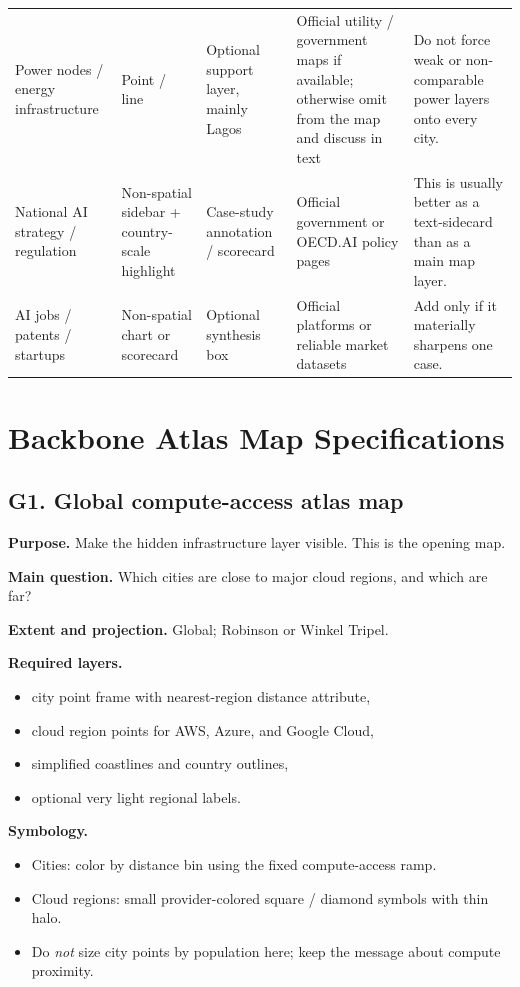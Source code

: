 \documentclass[11pt]{article}
\begin{document}
\begin{longtable}{P{0.18\textwidth} P{0.12\textwidth} P{0.2\textwidth} P{0.23\textwidth} P{0.2\textwidth}}
Power nodes / energy infrastructure & Point / line & Optional support layer, mainly Lagos & Official utility / government maps if available; otherwise omit from the map and discuss in text & Do not force weak or non-comparable power layers onto every city. \\
National AI strategy / regulation & Non-spatial sidebar + country-scale highlight & Case-study annotation / scorecard & Official government or OECD.AI policy pages & This is usually better as a text-sidecard than as a main map layer. \\
AI jobs / patents / startups & Non-spatial chart or scorecard & Optional synthesis box & Official platforms or reliable market datasets & Add only if it materially sharpens one case. \\
\bottomrule
\end{longtable}

\section{Backbone Atlas Map Specifications}

\subsection{G1. Global compute-access atlas map}
\textbf{Purpose.} Make the hidden infrastructure layer visible. This is the opening map.

\textbf{Main question.} Which cities are close to major cloud regions, and which are far?

\textbf{Extent and projection.} Global; Robinson or Winkel Tripel.

\textbf{Required layers.}
\begin{itemize}[leftmargin=1.4em,itemsep=0.2em]
    \item city point frame with nearest-region distance attribute,
    \item cloud region points for AWS, Azure, and Google Cloud,
    \item simplified coastlines and country outlines,
    \item optional very light regional labels.
\end{itemize}

\textbf{Symbology.}
\begin{itemize}[leftmargin=1.4em,itemsep=0.2em]
    \item Cities: color by distance bin using the fixed compute-access ramp.
    \item Cloud regions: small provider-colored square / diamond symbols with thin halo.
    \item Do \emph{not} size city points by population here; keep the message about compute proximity.
\end{itemize}
\end{document}
